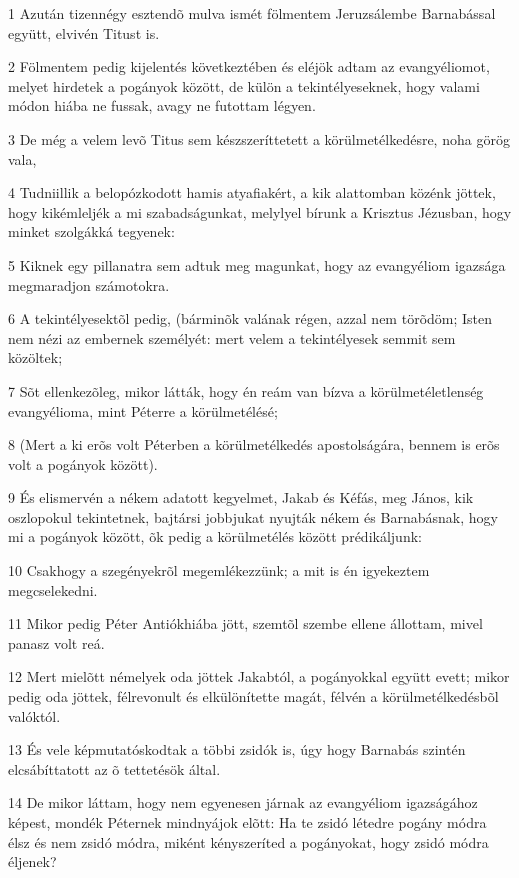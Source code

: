 \par 1 Azután tizennégy esztendõ mulva ismét fölmentem Jeruzsálembe Barnabással együtt, elvivén Titust is.
\par 2 Fölmentem pedig kijelentés következtében és eléjök adtam az evangyéliomot, melyet hirdetek a pogányok között, de külön a tekintélyeseknek, hogy valami módon hiába ne fussak, avagy ne futottam légyen.
\par 3 De még a velem levõ Titus sem készszeríttetett a körülmetélkedésre, noha görög vala,
\par 4 Tudniillik a belopózkodott hamis atyafiakért, a kik alattomban közénk jöttek, hogy kikémleljék a mi szabadságunkat, melylyel bírunk a Krisztus Jézusban, hogy minket szolgákká tegyenek:
\par 5 Kiknek egy pillanatra sem adtuk meg magunkat, hogy az evangyéliom igazsága megmaradjon számotokra.
\par 6 A tekintélyesektõl pedig, (bárminõk valának régen, azzal nem törõdöm; Isten nem nézi az embernek személyét: mert velem a tekintélyesek semmit sem közöltek;
\par 7 Sõt ellenkezõleg, mikor látták, hogy én reám van bízva a körülmetéletlenség evangyélioma, mint Péterre a körülmetélésé;
\par 8 (Mert a ki erõs volt Péterben a körülmetélkedés apostolságára, bennem is erõs volt a pogányok között).
\par 9 És elismervén a nékem adatott kegyelmet, Jakab és Kéfás, meg János, kik oszlopokul tekintetnek, bajtársi jobbjukat nyujták nékem és Barnabásnak, hogy mi a pogányok között, õk pedig a körülmetélés között prédikáljunk:
\par 10 Csakhogy a szegényekrõl megemlékezzünk; a mit is én igyekeztem megcselekedni.
\par 11 Mikor pedig Péter Antiókhiába jött, szemtõl szembe ellene állottam, mivel panasz volt reá.
\par 12 Mert mielõtt némelyek oda jöttek Jakabtól, a pogányokkal együtt evett; mikor pedig oda jöttek, félrevonult és elkülönítette magát, félvén a körülmetélkedésbõl valóktól.
\par 13 És vele képmutatóskodtak a többi zsidók is, úgy hogy Barnabás szintén elcsábíttatott az õ tettetésök által.
\par 14 De mikor láttam, hogy nem egyenesen járnak az evangyéliom igazságához képest, mondék Péternek mindnyájok elõtt: Ha te zsidó létedre pogány módra élsz és nem zsidó módra, miként kényszeríted a pogányokat, hogy zsidó módra éljenek?
